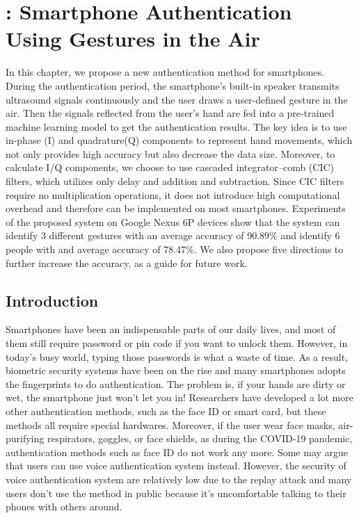\chapter{{\uu}: Smartphone Authentication \protect \\ Using Gestures in the Air}

In this chapter, we propose a new authentication method for smartphones. During the authentication period, the smartphone's built-in speaker transmits ultrasound signals continuously and the user draws a user-defined gesture in the air. Then the signals reflected from the user's hand are fed into a pre-trained machine learning model to get the authentication results. The key idea is to use in-phase (I) and quadrature(Q) components to represent hand movements, which not only provides high accuracy but also decrease the data size. Moreover, to calculate I/Q components, we choose to use cascaded integrator–comb (CIC) filters, which utilizes only delay and addition and subtraction. Since CIC filters require no multiplication operations, it does not introduce high computational overhead and therefore can be implemented on most smartphones. Experiments of the proposed {\uu} system on Google Nexus 6P devices show that the system can identify 3 different gestures with an average accuracy of 90.89\% and identify 6 people with and average accuracy of 78.47\%. We also propose five directions to further increase the accuracy, as a guide for future work.


\section{Introduction}
Smartphones have been an indispensable parts of our daily lives, and most of them still require password or pin code if you want to unlock them. However, in today’s busy world, typing those passwords is what a waste of time. As a result, biometric security systems have been on the rise and many smartphones adopts the fingerprints to do authentication. The problem is, if your hands are dirty or wet, the smartphone just won’t let you in! Researchers have developed a lot more other authentication methods, such as the face ID or smart card, but these methods all require special hardwares. Moreover, if the user wear face masks, air-purifying respirators, goggles, or face shields, as during the COVID-19 pandemic, authentication methods such as face ID do not work any more. Some may argue that users can use voice authentication system instead. However, the security of voice authentication system are relatively low due to the replay attack and many users don't use the method in public because it’s uncomfortable talking to their phones with others around.

